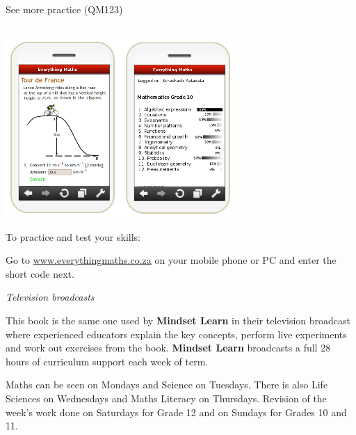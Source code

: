 {{\begin{center}
\caption{See more practice  (QM123)} \\
\includegraphics[width=0.65\textwidth]{title_images/practicephones.png}
\end{center}
\par



To practice and test your skills:\par

Go to \underline{www.everythingmaths.co.za} on your mobile phone or PC and enter the short code next.\par

\vspace*{1cm}


{\normalfont\sffamily\fontsize{22}\normalfont\itshape Television broadcasts} \par
This book is the same one used by \textbf{Mindset Learn} in their television broadcast where experienced
educators explain the key concepts, perform live experiments and work out exercises from the book.
\textbf{Mindset Learn} broadcasts a full 28 hours of curriculum support each week of term. \par


Maths can be seen on Mondays and Science on Tuesdays. There is also Life Sciences on Wednesdays
and Maths Literacy on Thursdays. Revision of the week's work done on Saturdays for Grade 12 and on
Sundays for Grades 10 and 11.


}




\newpage
\thispagestyle{empty}
{\Large

}}
